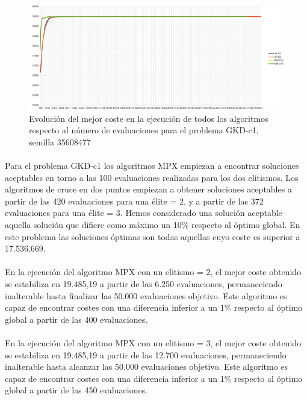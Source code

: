 	\begin{figure}[H]
		\centering
		\includegraphics[scale=0.3]{img/35608477_GKD-c_1_n500_m50.png}
		\caption{Evolución del mejor coste en la ejecución de todos los algoritmos respecto al número de evaluaciones para el problema GKD-c1, semilla 35608477}
		\label{gkd-c1_historico}
	\end{figure}

	\paragraph{}Para el problema GKD-c1 los algoritmos MPX empiezan a encontrar soluciones aceptables en torno a las 100 evaluaciones realizadas para los dos elitismos. Los algoritmos de cruce en dos puntos empiezan a obtener soluciones aceptables a partir de las 420 evaluaciones para una élite = 2, y a partir de las 372 evaluaciones para una élite = 3. Hemos considerado una solución aceptable aquella solución que difiere como máximo un 10\% respecto al óptimo global. En este problema las soluciones óptimas son todas aquellas cuyo coste es superior a 17.536,669.
	
	\paragraph{}En la ejecución del algoritmo MPX con un elitismo = 2, el mejor coste obtenido se estabiliza en 19.485,19 a partir de las 6.250 evaluaciones, permaneciendo inalterable hasta finalizar las 50.000 evaluaciones objetivo. Este algoritmo es capaz de encontrar costes con una diferencia inferior a un 1\% respecto al óptimo global a partir de las 400 evaluaciones.
	
	\paragraph{}En la ejecución del algoritmo MPX con un elitismo = 3, el mejor coste obtenido se estabiliza en 19.485,19 a partir de las 12.700 evaluaciones, permaneciendo inalterable hasta alcanzar las 50.000 evaluaciones objetivo. Este algoritmo es capaz de encontrar costes con una diferencia inferior a un 1\% respecto al óptimo global a partir de las 450 evaluaciones.
	
